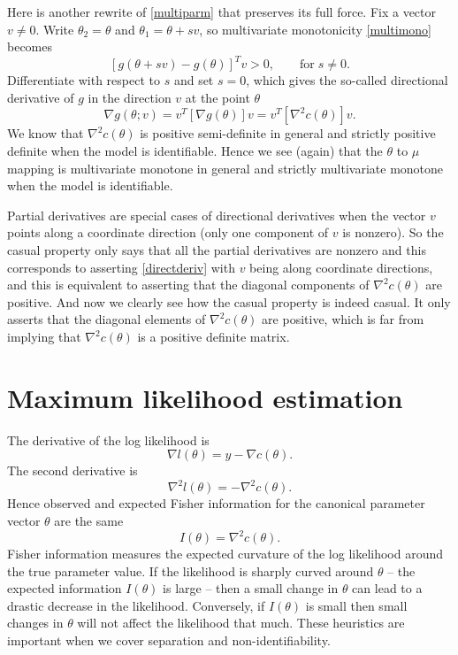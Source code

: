 \documentclass[12pt]{article}
\begin{document}
Here is another rewrite of \eqref{multiparm} that preserves its full force. Fix a vector $v \neq 0$. Write $\theta_2 = \theta$ and $\theta_1 = \theta + sv$, so multivariate monotonicity \eqref{multimono} becomes 
$$
  \left[g(\theta + sv) - g(\theta)\right]^Tv > 0, \qquad \text{for} \; s \neq 0.
$$
Differentiate with respect to $s$ and set $s = 0$, which gives the so-called directional derivative of $g$ in the direction $v$ at the point $\theta$
\begin{equation} \label{directderiv}
  \nabla g(\theta; v) = v^T\left[\nabla g(\theta)\right]v = v^T\left[\nabla^2 c(\theta)\right]v.
\end{equation}
We know that $\nabla^2 c(\theta)$ is positive semi-definite in general and strictly positive definite when the model is identifiable. Hence we see (again) that the $\theta$ to $\mu$ mapping is multivariate monotone in general and strictly multivariate monotone when the model is identifiable.

Partial derivatives are special cases of directional derivatives when the vector $v$ points along a coordinate direction (only one component of $v$ is nonzero). So the casual property only says that all the partial derivatives are nonzero and this corresponds to asserting \eqref{directderiv} with $v$ being along coordinate directions, and this is equivalent to asserting that the diagonal components of $\nabla^2 c(\theta)$ are positive. And now we clearly see how the casual property is indeed casual. It only asserts that the diagonal elements of $\nabla^2 c(\theta)$ are positive, which is far from implying that $\nabla^2 c(\theta)$ is a positive definite matrix.


\section*{Maximum likelihood estimation}

The derivative of the log likelihood is 
$$
  \nabla l(\theta) = y - \nabla c(\theta).
$$
The second derivative is 
$$
  \nabla^2 l(\theta) = -\nabla^2 c(\theta).
$$
Hence observed and expected Fisher information for the canonical parameter vector $\theta$ are the same
\begin{equation} \label{FI}
	I(\theta) = \nabla^2 c(\theta).
\end{equation}
Fisher information measures the expected curvature of the log likelihood around the true parameter value. If the likelihood is sharply curved around $\theta$ -- the expected information $I(\theta)$ is large -- then a small change in $\theta$ can lead to a drastic decrease in the likelihood. Conversely, if $I(\theta)$ is small then small changes in $\theta$ will not affect the likelihood that much. These heuristics are important when we cover separation and non-identifiability. 
\end{document}
